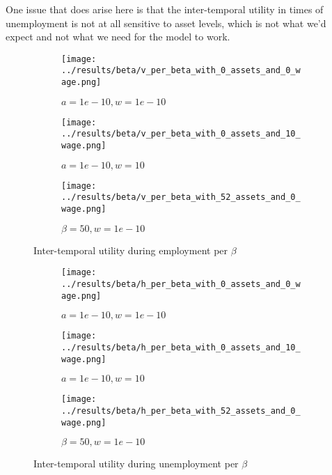 \documentclass[12pt]{article}
\begin{document}
\vspace{5mm}
One issue that does arise here is that the inter-temporal utility in times of unemployment is not at all sensitive to asset levels, which is not what we'd expect and not what we need for the model to work.

\begin{figure}[hbt!]

\begin{subfigure}{0.33\textwidth}
\texttt{[image: ../results/beta/v\_per\_beta\_with\_0\_assets\_and\_0\_wage.png]}
\caption{$a=1e-10, w=1e-10$}
\end{subfigure}%
\begin{subfigure}{0.33\textwidth}
\texttt{[image: ../results/beta/v\_per\_beta\_with\_0\_assets\_and\_10\_wage.png]}
\caption{$a=1e-10, w=10$}
\end{subfigure}%
\begin{subfigure}{0.33\textwidth}
\texttt{[image: ../results/beta/v\_per\_beta\_with\_52\_assets\_and\_0\_wage.png]}
\caption{$\beta=50, w=1e-10$}
\end{subfigure}

\caption{Inter-temporal utility during employment per $\beta$}
\label{fig:v_per_beta}
\end{figure}

\begin{figure}[hbt!]

\begin{subfigure}{0.33\textwidth}
\texttt{[image: ../results/beta/h\_per\_beta\_with\_0\_assets\_and\_0\_wage.png]}
\caption{$a=1e-10, w=1e-10$}
\end{subfigure}%
\begin{subfigure}{0.33\textwidth}
\texttt{[image: ../results/beta/h\_per\_beta\_with\_0\_assets\_and\_10\_wage.png]}
\caption{$a=1e-10, w=10$}
\end{subfigure}%
\begin{subfigure}{0.33\textwidth}
\texttt{[image: ../results/beta/h\_per\_beta\_with\_52\_assets\_and\_0\_wage.png]}
\caption{$\beta=50, w=1e-10$}
\end{subfigure}

\caption{Inter-temporal utility during unemployment per $\beta$}
\label{fig:h_per_beta}
\end{figure}


\clearpage
\end{document}
